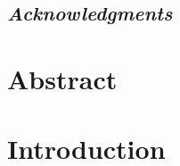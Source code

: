 \documentclass[12pt,a4paper,oldfontcommands,openright]{memoir}
\begin{document}


\cleardoublepage


\section*{{\em Acknowledgments}}
\label{chap:acknowledgments}

\thispagestyle{empty}
\cleardoublepage





\chapter*[Abstract]{Abstract}


\thispagestyle{empty}
\cleardoublepage


\renewcommand{\contentsname}{\vspace*{-3em} Table of Contents}
\renewcommand{\listfigurename}{\vspace*{-3em}List of Figures}
\renewcommand{\listtablename}{\vspace*{-3em}List of Tables}

\tableofcontents*
\thispagestyle{empty}
\cleardoublepage

\listoffigures*
\thispagestyle{empty}
\cleardoublepage

\listoftables*
\thispagestyle{empty}
\cleardoublepage


\chapter[Introduction]{Introduction}
\label{chap:intro}

\end{document}
